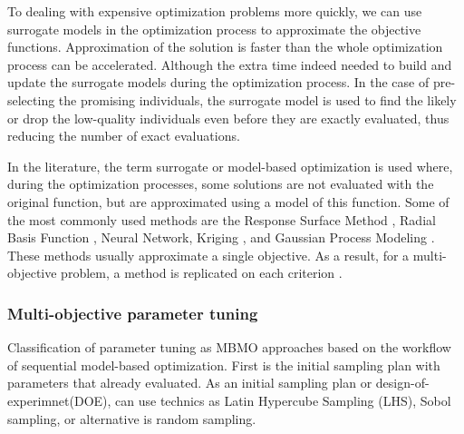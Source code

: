         \cite{EngSurMod} 

        To dealing with expensive optimization problems more quickly, we can use surrogate models in the optimization process to approximate the objective functions. Approximation of the solution is faster than the whole optimization process can be accelerated. Although the extra time indeed needed to build and update the surrogate models during the optimization process. 
        In the case of pre-selecting the promising individuals, the surrogate model is used to find the likely or drop the low-quality individuals even before they are exactly evaluated, thus reducing the number of exact evaluations.

        In the literature, the term surrogate or model-based optimization is used where, during the optimization processes, some solutions are not evaluated with the original function, but are approximated using a model of this function. Some of the most commonly used methods are the Response Surface Method \cite{ResponseSurface}, Radial Basis Function \cite{Rasmussen2004}, Neural Network, Kriging \cite{Woodard00}, and Gaussian Process Modeling \cite{RasmussenN10, RasmussenW06}. These methods usually approximate a single objective. As a result, for a multi-objective problem, a method is replicated on each criterion \cite{Knowles06, nardi2019practical}.

        \subsubsection{Multi-objective parameter tuning}

            Classification of parameter tuning as MBMO approaches based on the workflow of sequential model-based optimization. First is the initial sampling plan with parameters that already evaluated. As an initial sampling plan or design-of-experimnet(DOE), can use technics as Latin Hypercube Sampling (LHS), Sobol sampling, or alternative is random sampling.
            
